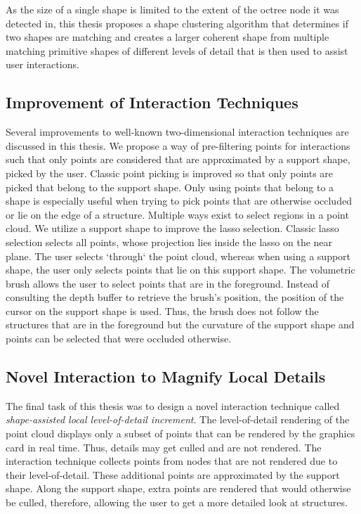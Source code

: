 \par

As the size of a single shape is limited to the extent of the octree node it was detected in, this thesis proposes a shape clustering algorithm that determines if two shapes are matching and creates a larger coherent shape from multiple matching primitive shapes of different levels of detail that is then used to assist user interactions. 


\subsection*{Improvement of Interaction Techniques}

Several improvements to well-known two-dimensional interaction techniques are discussed in this thesis. We propose a way of pre-filtering points for interactions such that only points are considered that are approximated by a support shape, picked by the user. Classic point picking is improved so that only points are picked that belong to the support shape. Only using points that belong to a shape is especially useful when trying to pick points that are otherwise occluded or lie on the edge of a structure. Multiple ways exist to select regions in a point cloud. We utilize a support shape to improve the lasso selection. Classic lasso selection selects all points, whose projection lies inside the lasso on the near plane. The user selects `through` the point cloud, whereas when using a support shape, the user only selects points that lie on this support shape. The volumetric brush allows the user to select points that are in the foreground. Instead of consulting the depth buffer to retrieve the brush's position, the position of the cursor on the support shape is used. Thus, the brush does not follow the structures that are in the foreground but the curvature of the support shape and points can be selected that were occluded otherwise. 


\subsection*{Novel Interaction to Magnify Local Details}

The final task of this thesis was to design a novel interaction technique called \textit{shape-assisted local level-of-detail increment}. The level-of-detail rendering of the point cloud displays only a subset of points that can be rendered by the graphics card in real time. Thus, details may get culled and are not rendered. The interaction technique collects points from nodes that are not rendered due to their level-of-detail. These additional points are approximated by the support shape. Along the support shape, extra points are rendered that would otherwise be culled, therefore, allowing the user to get a more detailed look at structures. 


